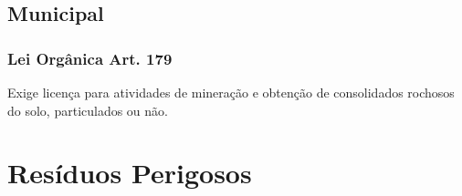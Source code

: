 \begin{subapend}
	\subsection{Municipal}
	\begin{subsubapend}
		\item \subsubsection{Lei Orgânica Art. 179}
		Exige licença para atividades de mineração e obtenção de consolidados rochosos do solo, particulados ou não.
	\end{subsubapend}
\end{subapend}

\section{Resíduos Perigosos}

